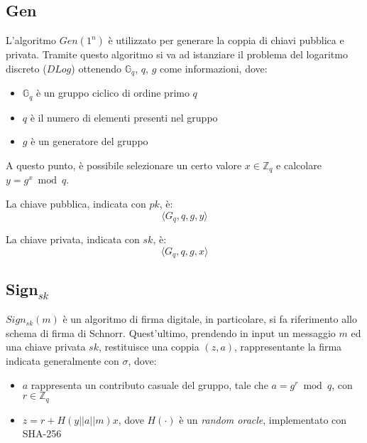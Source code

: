         \subsection{Gen}
            L’algoritmo $Gen(1^n)$ è utilizzato per generare la coppia di chiavi pubblica e privata.
            Tramite questo algoritmo si va ad istanziare il problema del logaritmo discreto ($DLog$) ottenendo $\mathbb{G}_q$, $q$, $g$ come informazioni, dove:

            \begin{itemize}
                \item $\mathbb{G}_q$ è un gruppo ciclico di ordine primo $q$

                \item $q$ è il numero di elementi presenti nel gruppo

                \item $g$ è un generatore del gruppo
            \end{itemize}

            \noindent A questo punto, è possibile selezionare un certo valore $x \in \mathbb{Z}_q$ e calcolare $y = g^x \bmod{q}$.
            
            \noindent La chiave pubblica, indicata con $pk$, è:
            $$\langle G_q, q, g, y \rangle$$
            
            \noindent La chiave privata, indicata con $sk$, è:
            $$\langle G_q, q, g, x \rangle$$

        \subsection{Sign$_{sk}$}
            $Sign_{sk}(m)$ è un algoritmo di firma digitale, in particolare, si fa riferimento allo schema di firma di Schnorr.
            Quest'ultimo, prendendo in input un messaggio $m$ ed una chiave privata $sk$, restituisce una coppia $(z, a)$, rappresentante la firma indicata generalmente con $\sigma$, dove:

            \begin{itemize}
                \item $a$ rappresenta un contributo casuale del gruppo, tale che $a = g^r \bmod{q}$, con $r \in \mathbb{Z}_q$

                \item $z = r + H(y||a||m) x$, dove $H(\cdot)$ è un \textit{random oracle}, implementato con SHA-256
            \end{itemize}

